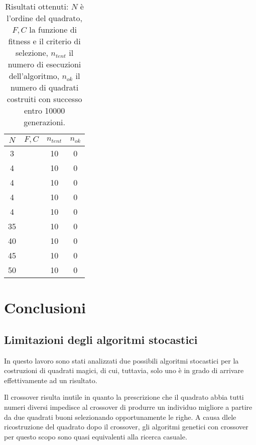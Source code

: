 \documentclass[italian,twoside,twocolumn]{article}
\begin{document}
\begin{table}
	\centering
	\caption{Risultati ottenuti: $ N $ è l'ordine del quadrato, $ F,C $ la funzione di fitness e il criterio di selezione, $ n_{tent} $ il numero di esecuzioni dell'algoritmo, $ n_{ok} $ il numero di quadrati costruiti con successo entro 10000 generazioni.}
	\begin{tabular}{cc|cc}
		\hline
		$ N $ & $ F,C $ & $ n_{tent} $ & $ n_{ok} $ \\ \hline
		  3   &         &      10      &     0      \\
		  4   &         &      10      &     0      \\
		  4   &         &      10      &     0      \\
		  4   &         &      10      &     0      \\
		  4   &         &      10      &     0      \\
		 35   &         &      10      &     0      \\
		 40   &         &      10      &     0      \\
		 45   &         &      10      &     0      \\
		 50   &         &      10      &     0      \\ \hline
	\end{tabular} 
	\label{tab:risultati_genetic}
\end{table}


\section{Conclusioni}

\subsection{Limitazioni degli algoritmi stocastici}
In questo lavoro sono stati analizzati due possibili algoritmi stocastici per la costruzioni di quadrati magici, di cui, tuttavia, solo uno è in grado di arrivare effettivamente ad un risultato. 

Il crossover risulta inutile in quanto la prescrizione che il quadrato abbia tutti numeri diversi impedisce al crossover di produrre un individuo migliore a partire da due quadrati buoni selezionando opportunamente le righe. A causa dlele ricostruzione del quadrato dopo il crossover, gli algoritmi genetici con crossover per questo scopo sono quasi equivalenti alla ricerca casuale. 
\end{document}
